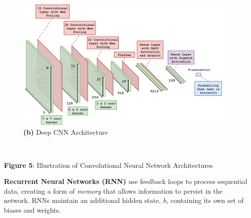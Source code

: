 \documentclass[12pt,a4paper]{article}
\begin{document}
\begin{minipage}{0.6\textwidth}
	\begin{figure}[H]
		\includegraphics[width=0.97\textwidth]{Images/DCNNarchNew.png}
		\centering\textbf{(b)} Deep CNN Architecture\\
	\end{figure}
\end{minipage}\\\vspace{-7pt}

\begin{center}
	\textbf{Figure 5}: Illustration of Convolutional Neural Network Architectures\\
\end{center}


\noindent \textbf{Recurrent Neural Networks (RNN)} use feedback loops to process sequential data, creating a form of \textit{memory} that allows information to persist in the network. RNNs maintain an additional hidden state, \textit{h}, containing its own set of biases and weights.\vspace{5pt}
\end{document}
